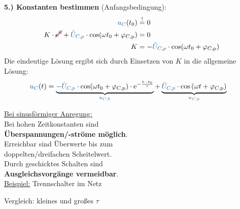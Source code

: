 {\begin{frame}[t]
    \textbf{5.) Konstanten bestimmen} (Anfangsbedingung):
    \begin{align*}
        \ecv{u_C}(t_0) &\overset{!}{=} 0 \\
        K \cdot \redcancel{\mathrm{e}^{0}} + \ecv{\hat{U}_{C,p}} \cdot \cos(\omega t_0 + \varphi_{C,\mathrm{p}}) &= 0 \\
        K &= -\ecv{\hat{U}_{C,p}} \cdot \cos(\omega t_0 + \varphi_{C,\mathrm{p}})
    \end{align*}
    Die eindeutige Lösung ergibt sich durch Einsetzen von $K$ in die allgemeine Lösung:
    \begin{align*}
        \ecv{u_C}(t) &= \underbrace{-\ecv{\hat{U}_{C,p}} \cdot \cos(\omega t_0 + \varphi_{C,\mathrm{p}}) \cdot \mathrm{e}^{-\frac{t-t_0}{\tau}}}_{\ecv{u_{C,\mathrm{h}}}} + \underbrace{\ecv{\hat{U}_{C,p}} \cdot \cos\left(\omega t + \varphi_{C,\mathrm{p}}\right)}_{\ecv{u_{C,p}}} %
    \end{align*}
\end{frame}

\begin{frame}%
    \centering
    \begin{minipage}{0.48\textwidth}
        \underline{Bei sinusförmiger Anregung:}\\[1em]
        Bei hohen Zeitkonstanten sind\\ \textbf{Überspannungen/-ströme möglich}.\\[1em]\pause
        Erreichbar sind Überwerte bis zum\\ doppelten/dreifachen Scheitelwert.\\[1em]\pause
        Durch geschicktes Schalten sind\\ \textbf{Ausgleichsvorgänge vermeidbar}.\\[1em]\pause
        \underline{Beispiel:} Trennschalter im Netz
    \end{minipage}%
    \begin{minipage}{0.48\textwidth}\centering
        Vergleich: kleines und großes $\tau$
    \end{minipage}
\end{frame}

}%



